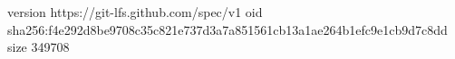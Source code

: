 version https://git-lfs.github.com/spec/v1
oid sha256:f4e292d8be9708c35c821e737d3a7a851561cb13a1ae264b1efc9e1cb9d7c8dd
size 349708
